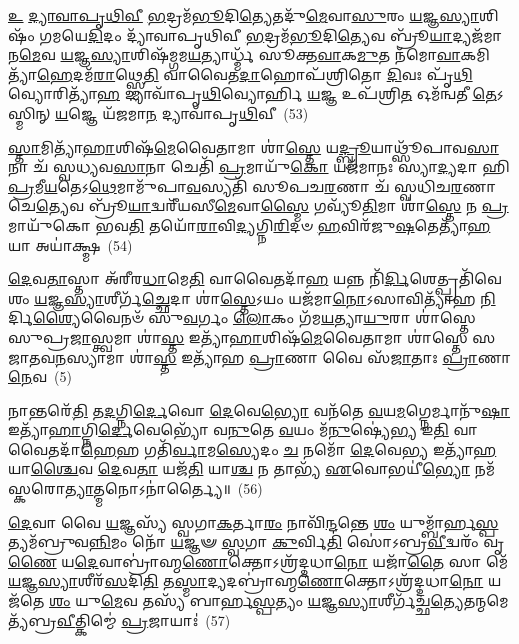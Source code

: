 \-\ul{𑌉} \ul{𑌦𑍍𑌯𑌾}\-\-\ul{𑌵𑌾}\-\-\ul{𑌪𑍃}\-\-\ul{𑌥𑌿}\-\-\ul{𑌵𑍀} \ul{𑌭}\-𑌦𑍍𑌰𑌮᳴\-\ul{𑌭𑍂}\-𑌦𑌿\-\ul{𑌤𑍍𑌯𑍇}\-𑌤𑌦𑍁᳴\-\ul{𑌮𑍇}\-𑌵𑌾\-\ul{𑌸𑍁}\-𑌰𑌂 \ul{𑌯}\-𑌜𑍍𑌞\-\ul{𑌸𑍍𑌯𑌾}\-𑌶𑌿𑌷𑌂᳴ 𑌗𑌮𑌯𑍇\-\ul{𑌦𑌿}\-𑌦𑌂 𑌦𑍍𑌯𑌾᳴𑌵𑌾𑌪𑍃𑌥𑌿𑌵𑍀 \ul{𑌭}\-𑌦𑍍𑌰𑌮᳴\-\ul{𑌭𑍂}\-𑌦𑌿\-\ul{𑌤𑍍𑌯𑍇}\-𑌵 𑌬𑍍𑌰𑍂᳴\-\ul{𑌯𑌾}\-𑌦𑍍𑌯𑌜᳴𑌮𑌾𑌨\-\ul{𑌮𑍇}\-𑌵 \ul{𑌯}\-𑌜𑍍𑌞\-\ul{𑌸𑍍𑌯𑌾}\-𑌶𑌿𑌷᳴𑌮𑍍𑌗𑌮\-\ul{𑌯}\-𑌤𑍍𑌯𑌾𑌰𑍍𑌧𑍍𑌮᳴ 𑌸𑍂𑌕𑍍𑌤\-\ul{𑌵𑌾}\-𑌕\-\ul{𑌮𑍁}\-𑌤 𑌨᳴𑌮𑍋\-\ul{𑌵𑌾}\-𑌕𑌮𑌿𑌤𑍍𑌯𑌾᳴\-\ul{𑌹𑍇}\-𑌦𑌮᳴\-\ul{𑌰𑌾}\-𑌥𑍍𑌸𑍍𑌮𑍇\-\ul{𑌤𑌿} 𑌵𑌾𑌵𑍈𑌤\-\ul{𑌦𑌾}\-𑌹𑍋𑌪᳴𑌶𑍍𑌰𑌿𑌤𑍋 \ul{𑌦𑌿}\-𑌵𑌃 𑌪𑍃᳴\-\ul{𑌥𑌿}\-𑌵𑍍𑌯𑍋𑌰𑌿𑌤𑍍𑌯𑌾᳴\-\ul{𑌹} 𑌦𑍍𑌯𑌾𑌵𑌾᳴𑌪𑍃\-\ul{𑌥𑌿}\-𑌵𑍍𑌯𑍋𑌰𑍍\mbox{}𑌹𑌿 \ul{𑌯}\-𑌜𑍍𑌞 𑌉𑌪᳴𑌶𑍍𑌰𑌿\-\ul{𑌤} 𑌓𑌮᳴𑌨𑍍𑌵𑌤𑍀 \ul{𑌤𑍇}\-\-𑌽𑌸𑍍𑌮𑌿𑌨𑍍 \ul{𑌯}\-𑌜𑍍𑌞𑍇 𑌯᳴𑌜𑌮𑌾\-\ul{𑌨} 𑌦𑍍𑌯𑌾𑌵𑌾᳴𑌪𑍃\-\ul{𑌥𑌿}\-𑌵𑍀~(53)

\-\ul{𑌸𑍍𑌤𑌾}\-𑌮𑌿𑌤𑍍𑌯𑌾᳴\-\ul{𑌹𑌾}\-𑌶𑌿𑌷᳴\-\ul{𑌮𑍇}\-𑌵𑍈𑌤𑌾𑌮𑌾 𑌶𑌾॑\-\ul{𑌸𑍍𑌤𑍇} 𑌯\-\ul{𑌦𑍍𑌬𑍍𑌰𑍂}\-𑌯𑌾𑌥𑍍𑌸𑍂᳴𑌪𑌾𑌵\-\ul{𑌸𑌾}\-𑌨𑌾 𑌚᳴ 𑌸𑍍𑌵𑌧𑍍𑌯𑌵\-\ul{𑌸𑌾}\-𑌨𑌾 𑌚𑍇𑌤𑌿᳴ \ul{𑌪𑍍𑌰}\-𑌮𑌾𑌯𑍁᳴\-\ul{𑌕𑍋} 𑌯𑌜᳴𑌮𑌾𑌨𑌃 𑌸𑍍𑌯𑌾\-\ul{𑌦𑍍𑌯}\-𑌦𑌾 𑌹𑌿 \ul{𑌪𑍍𑌰}\-𑌮𑍀\-\ul{𑌯}\-𑌤𑍇\-𑌽\-\ul{𑌥𑍇}\-𑌮𑌾𑌮𑍁᳴𑌪𑌾\-\ul{𑌵}\-𑌸𑍍𑌯𑌤𑌿᳴ 𑌸𑍂𑌪𑌚\-\ul{𑌰}\-𑌣𑌾 𑌚᳴ 𑌸𑍍𑌵𑌧𑌿𑌚\-\ul{𑌰}\-𑌣𑌾 𑌚𑍇\-\ul{𑌤𑍍𑌯𑍇}\-𑌵 𑌬𑍍𑌰𑍂᳴\-\ul{𑌯𑌾}\-𑌦𑍍𑌵𑌰𑍀᳴𑌯𑌸𑍀\-\ul{𑌮𑍇}\-𑌵𑌾\-\ul{𑌸𑍍𑌮𑍈} 𑌗𑌵𑍍𑌯𑍂᳴\-\ul{𑌤𑌿}\-𑌮𑌾 𑌶𑌾॑\-\ul{𑌸𑍍𑌤𑍇} 𑌨 \ul{𑌪𑍍𑌰}\-𑌮𑌾𑌯𑍁᳴𑌕𑍋 𑌭𑌵\-\ul{𑌤𑌿} 𑌤𑌯𑍋᳴\-\ul{𑌰𑌾}\-𑌵𑌿\-\ul{𑌦𑍍𑌯}\-𑌗𑍍𑌨𑌿\-\ul{𑌰𑌿}\-𑌦𑍞 \ul{𑌹}\-𑌵𑌿𑌰᳴𑌜𑍁\-\ul{𑌷}\-𑌤𑍇𑌤𑍍𑌯𑌾᳴\-\ul{𑌹} 𑌯𑌾 𑌅𑌯𑌾॑𑌕𑍍𑌷𑍍𑌮~(54)

\-\ul{𑌦𑍇}\-𑌵\-\ul{𑌤𑌾}\-𑌸𑍍𑌤𑌾 𑌅᳴𑌰𑍀𑌰\-\ul{𑌧𑌾}\-𑌮𑍇\-\ul{𑌤𑌿} 𑌵𑌾𑌵𑍈𑌤𑌦𑌾᳴\-\ul{𑌹} 𑌯𑌨𑍍𑌨 𑌨𑌿᳴\-\ul{𑌰𑍍𑌦𑌿}\-𑌶𑍇𑌤𑍍𑌪𑍍𑌰𑌤𑌿᳴𑌵𑍇𑌶𑌂 \ul{𑌯}\-𑌜𑍍𑌞\-\ul{𑌸𑍍𑌯𑌾}\-𑌶𑍀𑌰𑍍𑌗᳴\-\ul{𑌚𑍍𑌛𑍇}\-𑌦𑌾 𑌶𑌾॑\-\ul{𑌸𑍍𑌤𑍇}\-\-𑌽𑌯𑌂 𑌯𑌜᳴𑌮𑌾\-\ul{𑌨𑍋}\-\-𑌽𑌸𑌾𑌵𑌿𑌤𑍍𑌯𑌾᳴𑌹 \ul{𑌨𑌿}\-𑌰𑍍𑌦𑌿\-\ul{𑌶𑍍𑌯𑍈}\-𑌵𑍈𑌨𑍞᳴ 𑌸𑍁\-\ul{𑌵}\-𑌰𑍍𑌗𑌂 \ul{𑌲𑍋}\-𑌕𑌂 𑌗᳴𑌮\-\ul{𑌯}\-𑌤𑍍𑌯𑌾\-\ul{𑌯𑍁}\-𑌰𑌾 𑌶𑌾॑𑌸𑍍𑌤𑍇 𑌸𑍁𑌪𑍍𑌰\-\ul{𑌜𑌾}\-𑌸𑍍𑌤𑍍𑌵𑌮𑌾 𑌶𑌾॑\-\ul{𑌸𑍍𑌤} 𑌇𑌤𑍍𑌯𑌾᳴\-\ul{𑌹𑌾}\-𑌶𑌿𑌷᳴\-\ul{𑌮𑍇}\-𑌵𑍈𑌤𑌾𑌮𑌾 𑌶𑌾॑𑌸𑍍𑌤𑍇 𑌸𑌜𑌾𑌤𑌵\-\ul{𑌨}\-𑌸𑍍𑌯𑌾𑌮𑌾 𑌶𑌾॑\-\ul{𑌸𑍍𑌤} 𑌇𑌤𑍍𑌯𑌾᳴𑌹 \ul{𑌪𑍍𑌰𑌾}\-𑌣𑌾 𑌵𑍈 𑌸᳴\-\ul{𑌜𑌾}\-𑌤𑌾𑌃 \ul{𑌪𑍍𑌰𑌾}\-𑌣𑌾\-\ul{𑌨𑍇}\-𑌵~(5)

𑌨𑌾𑌨𑍍𑌤𑌰𑍇᳴\-\ul{𑌤𑌿} 𑌤\-\ul{𑌦}\-𑌗𑍍𑌨𑌿\-\ul{𑌰𑍍𑌦𑍇}\-𑌵𑍋 \ul{𑌦𑍇}\-𑌵𑍇\-\ul{𑌭𑍍𑌯𑍋} 𑌵𑌨᳴𑌤𑍇 \ul{𑌵}\-𑌯\-\ul{𑌮}\-𑌗𑍍𑌨𑍇𑌰𑍍𑌮𑌾𑌨𑍁᳴\-\ul{𑌷𑌾} 𑌇𑌤𑍍𑌯𑌾᳴\-\ul{𑌹𑌾}\-𑌗𑍍𑌨𑌿\-\ul{𑌰𑍍𑌦𑍇}\-𑌵𑍇𑌭𑍍𑌯𑍋᳴ 𑌵\-\ul{𑌨𑍁}\-𑌤𑍇 \ul{𑌵}\-𑌯𑌂 𑌮᳴\-\ul{𑌨𑍁}\-𑌷𑍍𑌯𑍇॑\-\ul{𑌭𑍍𑌯} 𑌇\-\ul{𑌤𑌿} 𑌵𑌾𑌵𑍈𑌤𑌦𑌾᳴\-\ul{𑌹𑍇}\-𑌹 𑌗𑌤𑌿᳴\-\ul{𑌰𑍍𑌵𑌾}\-𑌮\-\ul{𑌸𑍍𑌯𑍇}\-𑌦𑌂 \ul{𑌚} 𑌨𑌮𑍋᳴ \ul{𑌦𑍇}\-𑌵𑍇\-\ul{𑌭𑍍𑌯} 𑌇𑌤𑍍𑌯𑌾᳴\-\ul{𑌹} 𑌯𑌾\-\ul{𑌶𑍍𑌚𑍈}\-𑌵 \ul{𑌦𑍇}\-𑌵\-\ul{𑌤𑌾} 𑌯𑌜᳴\-\ul{𑌤𑌿} 𑌯𑌾\-\ul{𑌶𑍍𑌚} 𑌨 𑌤𑌾𑌭𑍍𑌯᳴ \ul{𑌏}\-𑌵𑍋𑌭𑌯𑍀॑\-\ul{𑌭𑍍𑌯𑍋} 𑌨𑌮᳴𑌸𑍍𑌕𑌰𑍋\-\ul{𑌤𑍍𑌯𑌾}\-𑌤𑍍𑌮𑌨𑍋\-𑌽𑌨𑌾॑𑌰𑍍𑌤𑍍𑌯𑍈॥~(56)

{\anuvakamend[{\-\ul{𑌶𑍍𑌰𑌿}\-𑌤\-\ul{𑌸𑍍𑌤𑍇} 𑌪𑍍𑌰 \ul{𑌤𑍍𑌰𑌿}\-𑌷𑍍𑌟𑍁𑌭᳴\-\ul{𑌮𑍇}\-𑌤𑌦𑍍𑌦𑍍𑌯𑌾𑌵𑌾᳴𑌪𑍃\-\ul{𑌥𑌿}\-𑌵𑍀 𑌯𑌾 𑌅𑌯𑌾॑𑌕𑍍𑌷𑍍𑌮 \ul{𑌪𑍍𑌰𑌾}\-𑌣𑌾\-\ul{𑌨𑍇}\-𑌵 𑌷𑌟𑍍𑌚᳴𑌤𑍍𑌵𑌾𑌰𑌿𑍞𑌶𑌚𑍍𑌚}]}%

\-\ul{𑌦𑍇}\-𑌵𑌾 𑌵𑍈 \ul{𑌯}\-𑌜𑍍𑌞𑌸𑍍𑌯᳴ 𑌸𑍍𑌵𑌗𑌾\-\ul{𑌕}\-𑌰𑍍𑌤𑌾\-\ul{𑌰𑌂} 𑌨𑌾𑌵𑌿᳴\-\ul{𑌨𑍍𑌦}\-𑌨𑍍𑌤𑍇 \ul{𑌶𑌂} 𑌯𑍁𑌮𑍍𑌬𑌾᳴𑌰𑍍\mbox{}𑌹\-\ul{𑌸𑍍𑌪}\-𑌤𑍍𑌯𑌮᳴𑌬𑍍𑌰𑍁𑌵\-\ul{𑌨𑍍𑌨𑌿}\-𑌮𑌂 𑌨𑍋᳴ \ul{𑌯}\-𑌜𑍍𑌞𑍟 \ul{𑌸𑍍𑌵}\-𑌗𑌾 \ul{𑌕𑍁}\-𑌰𑍍𑌵𑌿\-\ul{𑌤𑌿} 𑌸𑍋॑\-𑌽𑌬𑍍𑌰\-\ul{𑌵𑍀}\-𑌦𑍍𑌵𑌰𑌂᳴ 𑌵𑍃\-\ul{𑌣𑍈} 𑌯\-\ul{𑌦𑍇}\-𑌵𑌾𑌬𑍍𑌰𑌾॑𑌹𑍍𑌮\-\ul{𑌣𑍋}\-𑌕𑍍𑌤𑍋\-𑌽𑌶𑍍𑌰᳴𑌦𑍍𑌦𑌧𑌾\-\ul{𑌨𑍋} 𑌯𑌜𑌾᳴\-\ul{𑌤𑍈} 𑌸𑌾 𑌮𑍇᳴ \ul{𑌯}\-𑌜𑍍𑌞\-\ul{𑌸𑍍𑌯𑌾}\-𑌶𑍀𑌰᳴\-\ul{𑌸}\-𑌦𑌿\-\ul{𑌤𑌿} 𑌤\-\ul{𑌸𑍍𑌮𑌾}\-𑌦𑍍𑌯𑌦𑌬𑍍𑌰𑌾॑𑌹𑍍𑌮\-\ul{𑌣𑍋}\-𑌕𑍍𑌤𑍋\-𑌽𑌶𑍍𑌰᳴𑌦𑍍𑌦𑌧𑌾\-\ul{𑌨𑍋} 𑌯𑌜᳴𑌤𑍇 \ul{𑌶𑌂} 𑌯𑍁\-\ul{𑌮𑍇}\-𑌵 𑌤𑌸𑍍𑌯᳴ 𑌬𑌾𑌰𑍍\mbox{}𑌹\-\ul{𑌸𑍍𑌪}\-𑌤𑍍𑌯𑌂 \ul{𑌯}\-𑌜𑍍𑌞\-\ul{𑌸𑍍𑌯𑌾}\-𑌶𑍀𑌰𑍍𑌗᳴𑌚𑍍𑌛\-\ul{𑌤𑍍𑌯𑍇}\-𑌤𑌨𑍍𑌮𑌮𑍇𑌤𑍍𑌯᳴𑌬𑍍𑌰\-\ul{𑌵𑍀}\-𑌤𑍍𑌕𑌿𑌮𑍍𑌮𑍇॑ \ul{𑌪𑍍𑌰}\-𑌜𑌾𑌯𑌾𑌃॑~(57)


